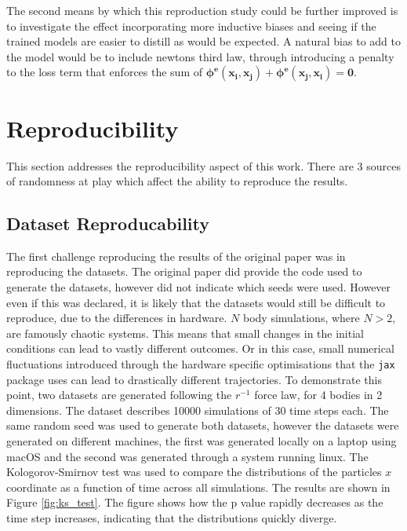 \documentclass[11pt]{article}
\begin{document}
    The second means by which this reproduction study could be further improved is to investigate the effect incorporating more inductive biases and seeing if the trained models are easier to distill as would be expected. A natural bias to add to the model would be to include newtons third law, through introducing a penalty to the loss term that enforces the sum of $\mathbf{\phi^{e}(x_i, x_j)} + \mathbf{\phi^e(x_j,x_i)} = \textbf{0}$.

\section{ Reproducibility}
This section addresses the reproducibility aspect of this work. There are 3 sources of randomness at play which affect the ability to reproduce the results. 
\subsection{Dataset Reproducability}
The first challenge reproducing the results of the original paper was in reproducing the datasets. The original paper did provide the code used to generate the datasets, however did not indicate which seeds were used. However even if this was declared, it is likely that the datasets would still be difficult to reproduce, due to the differences in hardware. $N$ body simulations, where $N > 2$, are famously chaotic systems. This means that small changes in the initial conditions can lead to vastly different outcomes. Or in this case, small numerical fluctuations introduced through the hardware specific optimisations that the \texttt{jax} package uses can lead to drastically different trajectories. To demonstrate this point, two datasets are generated following the $r^{-1}$ force law, for 4 bodies in 2 dimensions. The dataset describes 10000 simulations of 30 time steps each. The same random seed was used to generate both datasets, however the datasets were generated on different machines, the first was generated locally on a laptop using macOS and the second was generated through a system running linux. The Kologorov-Smirnov test was used to compare the distributions of the particles $x$ coordinate as a function of time across all simulations. The results are shown in Figure \ref{fig:ks_test}. The figure shows how the p value rapidly decreases as the time step increases, indicating that the distributions quickly diverge. 
\end{document}
